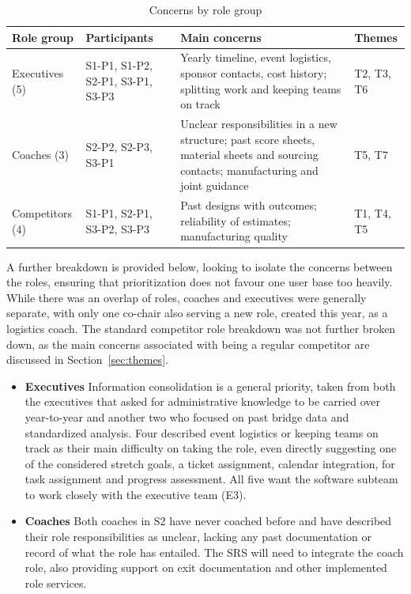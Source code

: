 \documentclass{article}
\begin{document}
\begin{table}[H]
\centering
\caption{Concerns by role group}
\label{tab:roles}
\small
\begin{tabularx}{\textwidth}{L{2.0cm} L{2.9cm} Y L{2.2cm}}
\toprule
\textbf{Role group} & \textbf{Participants} & \textbf{Main concerns} & \textbf{Themes} \\
\midrule
Executives (5) & S1-P1, S1-P2, S2-P1, S3-P1, S3-P3 & Yearly timeline, event logistics, sponsor contacts, cost history; splitting work and keeping teams on track & T2, T3, T6 \\
Coaches (3) & S2-P2, S2-P3, S3-P1 & Unclear responsibilities in a new structure; past score sheets, material sheets and sourcing contacts; manufacturing and joint guidance & T5, T7 \\
Competitors (4) & S1-P1, S2-P1, S3-P2, S3-P3 & Past designs with outcomes; reliability of estimates; manufacturing quality & T1, T4, T5 \\
\bottomrule
\end{tabularx}
\end{table}

A further breakdown is provided below, looking to isolate the concerns between the roles, ensuring that prioritization does not favour one 
user base too heavily. While there was an overlap of roles, coaches and executives were generally separate, with only one co-chair also serving 
a new role, created this year, as a logistics coach. The standard competitor role breakdown was not further broken down, as the main concerns 
associated with being a regular competitor are discussed in Section~\ref{sec:themes}.

\begin{itemize}

      \item \textbf{Executives} \newline Information consolidation is a general priority, taken from both  
      the executives that asked for administrative knowledge to be carried over year-to-year and another two 
      who focused on past bridge data and standardized analysis. Four described event logistics
      or keeping teams on track as their main difficulty on taking the role, even directly suggesting one 
      of the considered stretch goals, a ticket assignment, calendar integration, for task assignment and progress 
      assessment. All five want the software subteam to work closely with the executive team (E3).

      \item \textbf{Coaches} \newline Both coaches in S2 have never coached before and have described their 
      role responsibilities as unclear, lacking any past documentation or record of what the role has entailed. 
      The SRS will need to integrate the coach role, also providing support on exit documentation and other implemented 
      role services.

\end{itemize}
\end{document}
